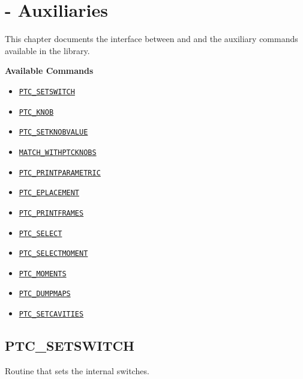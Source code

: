 
\chapter{{\madx}-{\ptc} Auxiliaries}
\label{chap:ptc_auxiliaries}

This chapter documents the interface between \madx and \ptc and the
auxiliary commands available in the \ptc library.

{\bf Available Commands }
\begin{itemize}
   \item \hyperref[sec:ptc_setswitch]{\tt PTC\_SETSWITCH}
   \item \hyperref[sec:ptc_knob]{\tt PTC\_KNOB}
   \item \hyperref[sec:ptc_setknobvalue]{\tt PTC\_SETKNOBVALUE}
   \item \hyperref[sec:match_withptcknobs]{\tt MATCH\_WITHPTCKNOBS}
   \item \hyperref[sec:ptc_printparametric]{\tt PTC\_PRINTPARAMETRIC}
   \item \hyperref[sec:ptc_eplacement]{\tt PTC\_EPLACEMENT}
   \item \hyperref[sec:ptc_printframes]{\tt PTC\_PRINTFRAMES}
   \item \hyperref[sec:ptc_select]{\tt PTC\_SELECT}
   \item \hyperref[sec:ptc_selectmoment]{\tt PTC\_SELECTMOMENT}
   \item \hyperref[sec:ptc_moments]{\tt PTC\_MOMENTS}  
   \item \hyperref[sec:ptc_dumpmaps]{\tt PTC\_DUMPMAPS}
   \item \hyperref[sec:ptc_setcavities]{\tt PTC\_SETCAVITIES}
\end{itemize}

\newpage

%

\section{PTC\_SETSWITCH}
\label{sec:ptc_setswitch}

Routine that sets the internal \ptc switches.


